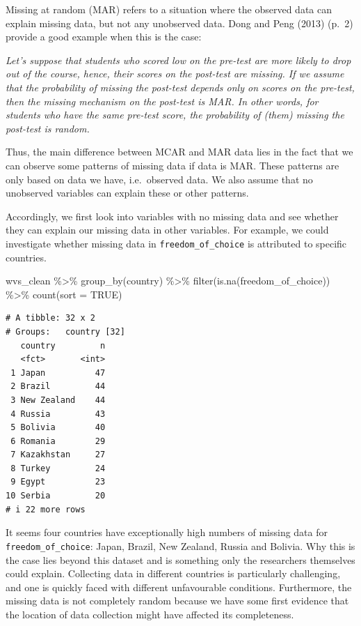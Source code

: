 \documentclass[
  letterpaper,
]{krantz}
\makeatletter
\newenvironment{Shaded}{\begin{snugshade}}{\end{snugshade}}
\newcommand{\AttributeTok}[1]{\textcolor[rgb]{0.40,0.45,0.13}{#1}}
\newcommand{\ConstantTok}[1]{\textcolor[rgb]{0.56,0.35,0.01}{#1}}
\newcommand{\FunctionTok}[1]{\textcolor[rgb]{0.28,0.35,0.67}{#1}}
\newcommand{\NormalTok}[1]{\textcolor[rgb]{0.00,0.23,0.31}{#1}}
\newcommand{\SpecialCharTok}[1]{\textcolor[rgb]{0.37,0.37,0.37}{#1}}
\renewenvironment{quote}{\begin{VF}}{\end{VF}}
\newenvironment{kframe}{%
\medskip{}
\setlength{\fboxsep}{.8em}
 \def\at@end@of@kframe{}%
 \ifinner\ifhmode%
  \def\at@end@of@kframe{\end{minipage}}%
  \begin{minipage}{\columnwidth}%
 \fi\fi%
 \def\FrameCommand##1{\hskip\@totalleftmargin \hskip-\fboxsep
 \colorbox{shadecolor}{##1}\hskip-\fboxsep
     \hskip-\linewidth \hskip-\@totalleftmargin \hskip\columnwidth}%
 \MakeFramed {\advance\hsize-\width
   \@totalleftmargin\z@ \linewidth\hsize
   \@setminipage}}%
 {\par\unskip\endMakeFramed%
 \at@end@of@kframe}
\renewenvironment{Shaded}{\begin{kframe}}{\end{kframe}}
\makeatother
\begin{document}
Missing at random (MAR) refers to a situation where the observed data
can explain missing data, but not any unobserved data. Dong and Peng
(2013) (p.~2) provide a good example when this is the case:

\begin{quote}
\emph{Let's suppose that students who scored low on the pre-test are
more likely to drop out of the course, hence, their scores on the
post-test are missing. If we assume that the probability of missing the
post-test depends only on scores on the pre-test, then the missing
mechanism on the post-test is MAR. In other words, for students who have
the same pre-test score, the probability of (them) missing the post-test
is random.}
\end{quote}

Thus, the main difference between MCAR and MAR data lies in the fact
that we can observe some patterns of missing data if data is MAR. These
patterns are only based on data we have, i.e.~observed data. We also
assume that no unobserved variables can explain these or other patterns.

Accordingly, we first look into variables with no missing data and see
whether they can explain our missing data in other variables. For
example, we could investigate whether missing data in
\texttt{freedom\_of\_choice} is attributed to specific countries.

\begin{Shaded}
\begin{Highlighting}[]
\NormalTok{wvs\_clean }\SpecialCharTok{\%\textgreater{}\%}
  \FunctionTok{group\_by}\NormalTok{(country) }\SpecialCharTok{\%\textgreater{}\%}
  \FunctionTok{filter}\NormalTok{(}\FunctionTok{is.na}\NormalTok{(freedom\_of\_choice)) }\SpecialCharTok{\%\textgreater{}\%}
  \FunctionTok{count}\NormalTok{(}\AttributeTok{sort =} \ConstantTok{TRUE}\NormalTok{)}
\end{Highlighting}
\end{Shaded}

\begin{verbatim}
# A tibble: 32 x 2
# Groups:   country [32]
   country         n
   <fct>       <int>
 1 Japan          47
 2 Brazil         44
 3 New Zealand    44
 4 Russia         43
 5 Bolivia        40
 6 Romania        29
 7 Kazakhstan     27
 8 Turkey         24
 9 Egypt          23
10 Serbia         20
# i 22 more rows
\end{verbatim}

It seems four countries have exceptionally high numbers of missing data
for \texttt{freedom\_of\_choice}: Japan, Brazil, New Zealand, Russia and
Bolivia. Why this is the case lies beyond this dataset and is something
only the researchers themselves could explain. Collecting data in
different countries is particularly challenging, and one is quickly
faced with different unfavourable conditions. Furthermore, the missing
data is not completely random because we have some first evidence that
the location of data collection might have affected its completeness.
\end{document}
